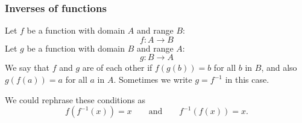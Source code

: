 \documentclass[10pt,t,presentation,ignorenonframetext,aspectratio=169]{beamer}
\begin{document}
\begin{frame}
  \frametitle{Inverses of functions}
  \begin{definition}
    Let $f$ be a function with domain $A$ and range $B$:
    \[
      f : A \to B
    \]
    Let $g$ be a function with domain $B$ and range $A$:
    \[
      g : B \to A
    \]
    We say that $f$ and $g$ are  of each other if $f(g(b))
    = b$ for all $b$ in $B$, and also $g(f(a)) = a$ for all $a$ in $A$.
    Sometimes we write $g = f^{-1}$ in this case.
  \end{definition}
  \vfill
  We could rephrase these conditions as
  \[
    f(f^{-1}(x)) = x\qquad\text{and}\qquad f^{-1}(f(x)) = x.
  \]
\end{frame}
\end{document}
